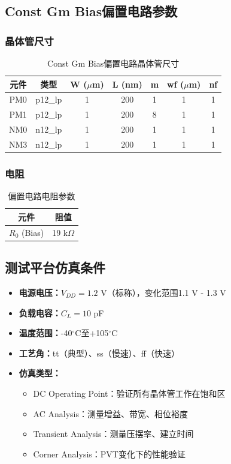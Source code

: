 \documentclass[UTF8,12pt,a4paper]{ctexart}
\begin{document}
\subsection{Const Gm Bias偏置电路参数}

\subsubsection{晶体管尺寸}

\begin{table}[h]
\centering
\caption{Const Gm Bias偏置电路晶体管尺寸}
\begin{tabular}{|c|c|c|c|c|c|c|}
\hline
\textbf{元件} & \textbf{类型} & \textbf{W ($\mu$m)} & \textbf{L (nm)} & \textbf{m} & \textbf{wf ($\mu$m)} & \textbf{nf} \\
\hline
PM0 & p12\_lp & 1 & 200 & 1 & 1 & 1 \\
PM1 & p12\_lp & 1 & 200 & 8 & 1 & 1 \\
NM0 & n12\_lp & 1 & 200 & 1 & 1 & 1 \\
NM3 & n12\_lp & 1 & 200 & 1 & 1 & 1 \\
\hline
\end{tabular}
\end{table}

\subsubsection{电阻}

\begin{table}[h]
\centering
\caption{偏置电路电阻参数}
\begin{tabular}{|c|c|}
\hline
\textbf{元件} & \textbf{阻值} \\
\hline
$R_0$ (Bias) & 19 k$\Omega$ \\
\hline
\end{tabular}
\end{table}

\subsection{测试平台仿真条件}

\begin{itemize}
    \item \textbf{电源电压：}$V_{DD} = 1.2$ V（标称），变化范围1.1 V - 1.3 V
    \item \textbf{负载电容：}$C_L = 10$ pF
    \item \textbf{温度范围：}-40$^\circ$C至+105$^\circ$C
    \item \textbf{工艺角：}tt（典型）、ss（慢速）、ff（快速）
    \item \textbf{仿真类型：}
    \begin{itemize}
        \item DC Operating Point：验证所有晶体管工作在饱和区
        \item AC Analysis：测量增益、带宽、相位裕度
        \item Transient Analysis：测量压摆率、建立时间
        \item Corner Analysis：PVT变化下的性能验证
    \end{itemize}
\end{itemize}
\end{document}
